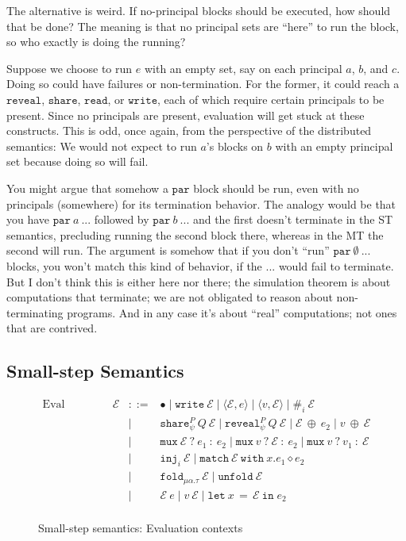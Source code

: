 \documentclass[10pt]{article}
\newcommand{\kw}[1]{\ensuremath{\mathtt{#1}}}
\newcommand{\trec}[2]{\ensuremath{\mu {#1}.{#2}}}
\newcommand{\ebinop}[2]{\ensuremath{{#1}~\oplus~{#2}}}
\newcommand{\elet}[3]{\ensuremath{\kw{let}~#1\, =\, #2~\kw{in}\;{#3}}}
\newcommand{\epar}[2]{\ensuremath{\kw{par}~{#1}~{#2}}}
\newcommand{\ereveal}[4]{\ensuremath{\kw{reveal}^{#1}_{#4}~{#2}~{#3}}}
\newcommand{\econd}[3]{\ensuremath{\kw{match}~{#1}~\kw{with}~x.{#2} \diamond {#3}}}
\newcommand{\emux}[3]{\ensuremath{\kw{mux}~{#1}~\kw{?}~{#2}~\kw{:}~{#3}}}
\newcommand{\eshare}[4]{\ensuremath{\kw{share}^{#2}_{#1}~{#3}~{#4}}}
\newcommand{\einj}[2]{\ensuremath{\kw{inj}_{#1}~{#2}}}
\newcommand{\ewrite}[1]{\ensuremath{\kw{write}~{#1}}}
\newcommand{\epair}[2]{\ensuremath{\langle {#1}, {#2} \rangle}}
\newcommand{\eproj}[2]{\ensuremath{\kw{\#}}_{#1}~{#2}}
\newcommand{\eapp}[2]{\ensuremath{{#1}~{#2}}}
\newcommand{\efold}[2]{\ensuremath{\kw{fold}_{#1}~{#2}}}
\newcommand{\eunfold}[1]{\ensuremath{\kw{unfold}~{#1}}}
\newcommand{\ctxt}{\ensuremath{\mathcal{E}}}
\begin{document}
The alternative is weird. If no-principal blocks should be executed,
how should that be done? The meaning is that no principal sets are
``here'' to run the block, so who exactly is doing the running? 

Suppose we choose to run $e$ with an empty set, say on each principal
$a$, $b$, and $c$. Doing so could have failures or non-termination. For the
former, it could reach a $\kw{reveal}$, $\kw{share}$, $\kw{read}$,
or $\kw{write}$, each of which require certain principals to be
present. Since no principals are present, evaluation will get stuck
at these constructs. This is odd, once again, from the perspective of
the distributed semantics: We would not expect to run $a$'s blocks on
$b$ with an empty principal set because doing so will fail.

You might argue that somehow a $\kw{par}$ block should be run, even
with no principals (somewhere) for its termination behavior. The
analogy would be that you have $\epar{a}{...}$ followed by
  $\epar{b}{...}$ and the first doesn't terminate in the ST semantics,
  precluding running the second block there, whereas in the MT the
  second will run. The argument is somehow that if you don't ``run''
  $\epar{\emptyset}{...}$ blocks, you won't match this kind of
    behavior, if the $...$ would fail to terminate. But I don't think this
is either here nor there; the simulation theorem is about computations
that terminate; we are not obligated to reason about non-terminating
programs. And in any case it's about ``real'' computations; not ones
that are contrived.

\subsection{Small-step Semantics}

\begin{figure}
  \[\begin{array}{rlcl}
      \text{Eval Context} & \ctxt & ::= & \bullet \mid \ewrite{\ctxt} \mid
                                          \epair{\ctxt}{e} \mid
                             \epair{v}{\ctxt} \mid \eproj{i}{\ctxt}  \\
               && \mid & \eshare{\psi}{P}{Q}{\ctxt} \mid
                             \ereveal{P}{Q}{\ctxt}{\psi} \mid \ebinop{\ctxt}{e_2} \mid \ebinop{v}{\ctxt}   \\
               && \mid & \emux{\ctxt}{e_1}{e_2}
                         \mid \emux{v}{\ctxt}{e_2} \mid \emux{v}{v_1}{\ctxt}    \\
               && \mid & \einj{i}{\ctxt} \mid \econd{\ctxt}{e_1}{e_2}   \\
               && \mid & \efold{\trec{\alpha}{\tau}}{\ctxt} \mid \eunfold{\ctxt}  \\
                          && \mid & \eapp{\ctxt}{e} \mid
                         \eapp{v}{\ctxt} \mid \elet{x}{\ctxt}{e_2} \\
    \end{array}
  \]
  \caption{Small-step semantics: Evaluation contexts}
  \label{fig:ctxts}
\end{figure}
\end{document}
